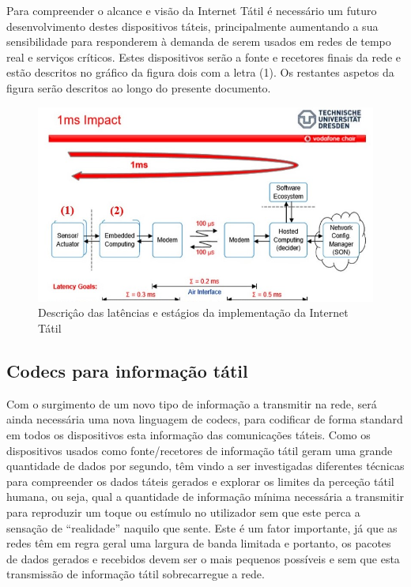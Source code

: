 \documentclass{llncs}
\begin{document}
Para compreender o alcance e visão da Internet Tátil é necessário um futuro desenvolvimento destes dispositivos táteis, principalmente aumentando a sua sensibilidade para responderem à demanda de serem usados em redes de tempo real e serviços críticos. Estes dispositivos serão a fonte e recetores finais da rede e estão descritos no gráfico da figura dois com a letra (1). Os restantes aspetos da figura serão descritos ao longo do presente documento.

\begin{figure}[!h]
\centering
\includegraphics[scale=0.6]{imagem3.jpg}
\caption{Descriçâo das latências e estágios da implementação da Internet Tátil ~\cite{Gerhard}}
\label{Rotulo}
\end{figure}

\subsection{Codecs para informação tátil}
\setlength{\parindent}{0.5cm}
Com o surgimento de um novo tipo de informação a transmitir na rede, será ainda necessária uma nova linguagem de codecs, para codificar de forma standard em todos os dispositivos esta informação das comunicações táteis. Como os dispositivos usados como fonte/recetores de informação tátil geram uma grande quantidade de dados por segundo, têm vindo a ser investigadas diferentes técnicas para compreender os dados táteis gerados e explorar os limites da perceção tátil humana, ou seja, qual a quantidade de informação mínima necessária a transmitir para reproduzir um toque ou estímulo no utilizador sem que este perca a sensação de “realidade” naquilo que sente. Este é um fator importante, já que as redes têm em regra geral uma largura de banda limitada e portanto, os pacotes de dados gerados e recebidos devem ser o mais pequenos possíveis e sem que esta transmissão de informação tátil sobrecarregue a rede.
\end{document}
